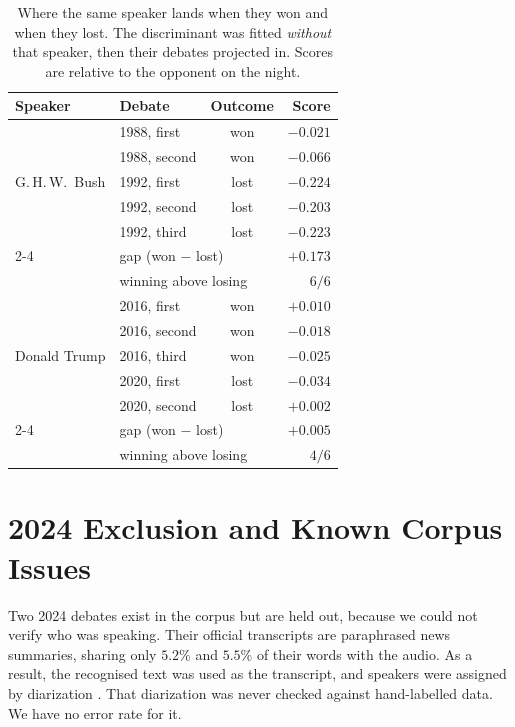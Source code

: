 \documentclass[pdflatex,sn-mathphys-num]{sn-jnl}%
\begin{document}
\begin{appendices}
\begin{table}[h]
\caption{Where the same speaker lands when they won and when they lost. The
discriminant was fitted \emph{without} that speaker, then their debates
projected in. Scores are relative to the opponent on the night.}
\label{tab:within}
\centering
\footnotesize
\begin{tabular}{llcr}
\toprule
Speaker & Debate & Outcome & Score \\
\midrule
\multirow{5}{*}{G.\,H.\,W.\ Bush}
 & 1988, first  & won  & $-0.021$ \\
 & 1988, second & won  & $-0.066$ \\
 & 1992, first  & lost & $-0.224$ \\
 & 1992, second & lost & $-0.203$ \\
 & 1992, third  & lost & $-0.223$ \\
\cmidrule(lr){2-4}
 & \multicolumn{2}{l}{gap (won $-$ lost)} & $+0.173$ \\
 & \multicolumn{2}{l}{winning above losing} & $6/6$ \\
\midrule
\multirow{5}{*}{Donald Trump}
 & 2016, first  & won  & $+0.010$ \\
 & 2016, second & won  & $-0.018$ \\
 & 2016, third  & won  & $-0.025$ \\
 & 2020, first  & lost & $-0.034$ \\
 & 2020, second & lost & $+0.002$ \\
\cmidrule(lr){2-4}
 & \multicolumn{2}{l}{gap (won $-$ lost)} & $+0.005$ \\
 & \multicolumn{2}{l}{winning above losing} & $4/6$ \\
\bottomrule
\end{tabular}
\end{table}

\section{2024 Exclusion and Known Corpus Issues}
\label{app:known}

Two 2024 debates exist in the corpus but are held out, because we could
not verify who was speaking. Their official transcripts are paraphrased
news summaries, sharing only $5.2\%$ and $5.5\%$ of their words with the
audio. As a result, the recognised text was used as the transcript, and
speakers were assigned by diarization \cite{bredin2023pyannote}. That
diarization was never checked against hand-labelled data. We have no
error rate for it.


\end{appendices}
\end{document}

